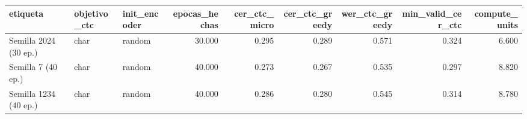 \begin{tabular}{lllrrrrrr}
\toprule
etiqueta & objetivo_ctc & init_encoder & epocas_hechas & cer_ctc_micro & cer_ctc_greedy & wer_ctc_greedy & min_valid_cer_ctc & compute_units \\
\midrule
Semilla 2024 (30 ep.) & char & random & 30.000 & 0.295 & 0.289 & 0.571 & 0.324 & 6.600 \\
Semilla 7 (40 ep.) & char & random & 40.000 & 0.273 & 0.267 & 0.535 & 0.297 & 8.820 \\
Semilla 1234 (40 ep.) & char & random & 40.000 & 0.286 & 0.280 & 0.545 & 0.314 & 8.780 \\
\bottomrule
\end{tabular}
